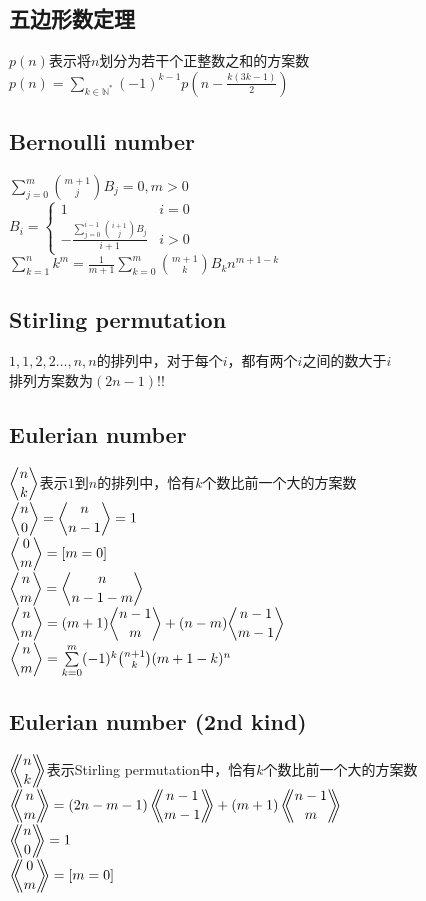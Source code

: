 	\subsection*{五边形数定理}
		$ p(n) $表示将$ n $划分为若干个正整数之和的方案数
		\\$ p(n) = \sum\limits_{k \in \mathbb{N}^\ast} (-1)^{k - 1} p(n - \frac{k(3k - 1)}{2}) $
	\subsection*{Bernoulli number}
		$ \sum\limits_{j = 0}^{m} \binom{m + 1}{j} B_j = 0, m > 0 $
		\\$ B_i = \begin{cases}
			1 & i = 0\\
			-\frac{\sum\limits_{j = 0}^{i - 1} \binom{i + 1}{j} B_j}{i + 1} & i > 0
		\end{cases} $
		\\$ \sum\limits_{k = 1}^{n} k ^ m = \frac{1}{m + 1} \sum\limits_{k = 0}^{m} \binom{m + 1}{k} B_k n ^ {m + 1 - k} $
	\subsection*{Stirling permutation}
		$ 1, 1, 2, 2 \dots , n, n $的排列中，对于每个$ i $，都有两个$ i $之间的数大于$ i $
		\\排列方案数为$ (2n - 1)!! $
	\subsection*{Eulerian number}
		$ \eularian{n}{k} $表示$ 1 $到$ n $的排列中，恰有$ k $个数比前一个大的方案数
		\\$ \eularian{n}{0} = \eularian{n}{n - 1} = 1 $
		\\$ \eularian{0}{m} = [m = 0] $
		\\$ \eularian{n}{m} = \eularian{n}{n - 1 - m} $
		\\$ \eularian{n}{m} = (m + 1) \eularian{n - 1}{m} + (n - m) \eularian{n - 1}{m - 1} $
		\\$ \eularian{n}{m} = \sum\limits_{k = 0}^{m} (-1)^k \binom{n + 1}{k} (m + 1 - k)^n $
	\subsection*{Eulerian number (2nd kind)}
		$ \Eularian{n}{k} $表示Stirling permutation中，恰有$ k $个数比前一个大的方案数
		\\$ \Eularian{n}{m} = (2n - m - 1) \Eularian{n - 1}{m - 1} + (m + 1) \Eularian{n - 1}{m} $
		\\$ \Eularian{n}{0} = 1 $
		\\$ \Eularian{0}{m} = [m = 0] $
